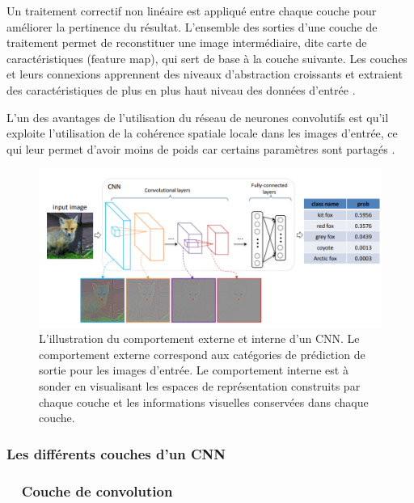 	
	Un traitement correctif non linéaire est appliqué entre chaque couche pour améliorer la pertinence du résultat. L'ensemble des sorties d'une couche de traitement permet de reconstituer une image intermédiaire, dite carte de caractéristiques (feature map), qui sert de base à la couche suivante. Les couches et leurs connexions apprennent des niveaux d'abstraction croissants et extraient des caractéristiques de plus en plus haut niveau des données d'entrée \cite{antoine2018apprentissage, shin2016deep}.
	
	L'un des avantages de l'utilisation du réseau de neurones convolutifs est qu'il exploite l'utilisation de la cohérence spatiale locale dans les images d'entrée, ce qui leur permet d'avoir moins de poids car certains paramètres sont partagés \cite{tammina2019transfer}.
	
	
	\begin{figure}[H]%
		\centering
		\includegraphics[width=\textwidth]{images/cnn-fox}
		\caption[L'illustration du comportement externe et interne d'un CNN.]{L'illustration du comportement externe et interne d'un CNN. Le comportement externe correspond aux catégories de prédiction de sortie pour les images d'entrée. Le comportement interne est à sonder en visualisant les espaces de représentation construits par chaque couche et les informations visuelles conservées dans chaque couche. \cite{yu2016visualizing}}
		\label{fig:cnn_exemple}
	\end{figure}
	
	
	\subsubsection{\textbf{Les différents couches d'un CNN}}
	
	\subsubsection*{\qquad \textbullet \ \ Couche de convolution}
	
